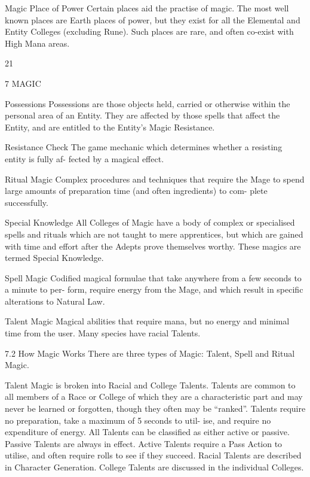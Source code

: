\begin{Chapter}{Magic}
Place  of  Power  Certain  places  aid  the  practise  of 
magic.  The  most  well  known  places  are  Earth 
places of power, but they exist for all the Elemental 
and Entity Colleges (excluding Rune). Such places 
are rare, and often co-exist with High Mana areas. 

21 

7 MAGIC 

Possessions  Possessions  are  those  objects  held, 
carried or otherwise within the personal area of an 
Entity. They are affected by those spells that affect 
the  Entity,  and  are  entitled  to  the  Entity’s  Magic 
Resistance. 

Resistance  Check  The  game  mechanic  which 
determines  whether  a  resisting  entity  is  fully  af-
fected by a magical effect. 

Ritual  Magic  Complex  procedures  and  techniques 
that  require  the  Mage  to  spend  large  amounts  of 
preparation  time  (and  often  ingredients)  to  com-
plete successfully. 

Special Knowledge All Colleges of  Magic have a 
body  of  complex  or  specialised  spells  and  rituals 
which  are  not  taught  to  mere  apprentices,  but 
which  are  gained  with  time  and  effort  after  the 
Adepts prove themselves worthy. These magics are 
termed Special Knowledge. 

Spell  Magic  Codified  magical  formulae  that  take 
anywhere  from  a  few  seconds  to  a  minute  to  per-
form,  require  energy  from  the  Mage,  and  which 
result in specific alterations to Natural Law. 

Talent Magic Magical  abilities that require  mana, 
but  no  energy  and  minimal  time  from  the  user. 
Many species have racial Talents. 

7.2 How Magic Works 
There  are  three  types  of  Magic:  Talent,  Spell  and 
Ritual Magic. 

Talent  Magic  is  broken  into  Racial  and  College 
Talents.  Talents  are  common  to  all  members  of  a 
Race  or  College  of  which they  are  a  characteristic 
part and may never be learned or forgotten, though 
they  often  may  be  “ranked”.  Talents  require  no 
preparation,  take  a  maximum of  5  seconds to  util-
ise,  and  require  no  expenditure  of  energy.  All 
Talents can be classified as either active or passive. 
Passive Talents are always in effect. Active Talents 
require  a  Pass  Action  to  utilise,  and  often  require 
rolls  to  see  if  they  succeed.  Racial  Talents  are 
described in Character Generation. College Talents 
are discussed in the individual Colleges. 


\end{Chapter}
